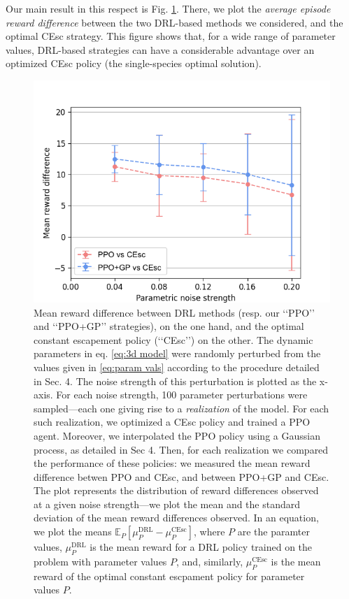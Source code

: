 \documentclass{article}
\begin{document}
Our main result in this respect is Fig. \ref{fig:stability}. There, we
plot the \emph{average episode reward difference} between the two
DRL-based methods we considered, and the optimal CEsc strategy. This
figure shows that, for a wide range of parameter values, DRL-based
strategies can have a considerable advantage over an optimized CEsc
policy (the single-species optimal solution).

\begin{figure}
  \centering
  \includegraphics[scale=0.8]{figures/jiggle_v1.png}
  \caption{Mean reward difference between DRL methods (resp. our ‘‘PPO’’ and ‘‘PPO+GP’’ strategies), on the one hand, and the optimal constant escapement policy (‘‘CEsc’’) on the other. The dynamic parameters in eq. \eqref{eq:3d model} were randomly perturbed from the values given in \eqref{eq:param vals} according to the procedure detailed in Sec. 4. The noise strength of this perturbation is plotted as the x-axis. For each noise strength, 100 parameter perturbations were sampled---each one giving rise to a \emph{realization} of the model. For each such realization, we optimized a CEsc policy and trained a PPO agent. Moreover, we interpolated the PPO policy using a Gaussian process, as detailed in Sec 4. Then, for each realization we compared the performance of these policies: we measured the mean reward difference betwen PPO and CEsc, and between PPO+GP and CEsc. The plot represents the distribution of reward differences observed at a given noise strength---we plot the mean and the standard deviation of the mean reward differences observed. In an equation, we plot the means $\mathbb{E}_{P}[\mu_P^{\text{DRL}}-\mu_P^{\text{CEsc}}]$, where $P$ are the paramter values, $\mu_P^{\text{DRL}}$ is the mean reward for a DRL policy trained on the problem with parameter values $P$, and, similarly, $\mu_P^{\text{CEsc}}$ is the mean reward of the optimal constant escpament policy for parameter values $P$.}
  \label{fig:stability}
\end{figure}
\end{document}
